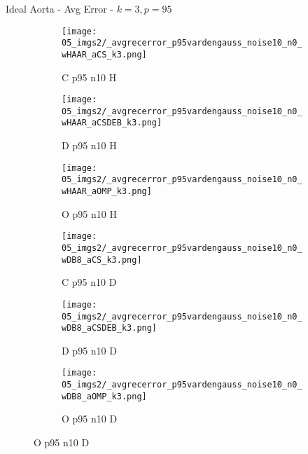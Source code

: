 \begin{frame}{Ideal Aorta - Avg Error - $k=3,p=95$}{}
\begin{figure}
\begin{subfigure}{0.13\textwidth}
\texttt{[image: 05\_imgs2/\_avgrecerror\_p95vardengauss\_noise10\_n0\_wHAAR\_aCS\_k3.png]}
\caption*{\tiny C p95 n10 H}
\end{subfigure}
\begin{subfigure}{0.13\textwidth}
\texttt{[image: 05\_imgs2/\_avgrecerror\_p95vardengauss\_noise10\_n0\_wHAAR\_aCSDEB\_k3.png]}
\caption*{\tiny D p95 n10 H}
\end{subfigure}
\begin{subfigure}{0.13\textwidth}
\texttt{[image: 05\_imgs2/\_avgrecerror\_p95vardengauss\_noise10\_n0\_wHAAR\_aOMP\_k3.png]}
\caption*{\tiny O p95 n10 H}
\end{subfigure}
\begin{subfigure}{0.13\textwidth}
\texttt{[image: 05\_imgs2/\_avgrecerror\_p95vardengauss\_noise10\_n0\_wDB8\_aCS\_k3.png]}
\caption*{\tiny C p95 n10 D}
\end{subfigure}
\begin{subfigure}{0.13\textwidth}
\texttt{[image: 05\_imgs2/\_avgrecerror\_p95vardengauss\_noise10\_n0\_wDB8\_aCSDEB\_k3.png]}
\caption*{\tiny D p95 n10 D}
\end{subfigure}
\begin{subfigure}{0.13\textwidth}
\texttt{[image: 05\_imgs2/\_avgrecerror\_p95vardengauss\_noise10\_n0\_wDB8\_aOMP\_k3.png]}
\caption*{\tiny O p95 n10 D}
\end{subfigure}

\vspace{5pt}


\end{figure}
\end{frame}

